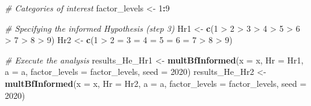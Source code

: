 \documentclass[
  english,
  man,floatsintext]{apa6}
\newenvironment{Shaded}{\begin{snugshade}}{\end{snugshade}}
\newcommand{\CommentTok}[1]{\textcolor[rgb]{0.56,0.35,0.01}{\textit{#1}}}
\newcommand{\DataTypeTok}[1]{\textcolor[rgb]{0.13,0.29,0.53}{#1}}
\newcommand{\DecValTok}[1]{\textcolor[rgb]{0.00,0.00,0.81}{#1}}
\newcommand{\KeywordTok}[1]{\textcolor[rgb]{0.13,0.29,0.53}{\textbf{#1}}}
\newcommand{\NormalTok}[1]{#1}
\newcommand{\OperatorTok}[1]{\textcolor[rgb]{0.81,0.36,0.00}{\textbf{#1}}}
\newcommand{\StringTok}[1]{\textcolor[rgb]{0.31,0.60,0.02}{#1}}
\begin{document}
\begin{Shaded}
\begin{Highlighting}[]
\CommentTok{\# Categories of interest}
\NormalTok{factor\_levels \textless{}{-}}\StringTok{ }\DecValTok{1}\OperatorTok{:}\DecValTok{9}

\CommentTok{\# Specifying the informed Hypothesis (step 3)}
\NormalTok{Hr1 \textless{}{-}}\StringTok{ }\KeywordTok{c}\NormalTok{(}\StringTok{\textquotesingle{}1 \textgreater{} 2 \textgreater{} 3 \textgreater{} 4 \textgreater{} 5 \textgreater{} 6 \textgreater{} 7 \textgreater{} 8 \textgreater{} 9\textquotesingle{}}\NormalTok{)}
\NormalTok{Hr2 \textless{}{-}}\StringTok{ }\KeywordTok{c}\NormalTok{(}\StringTok{\textquotesingle{}1 \textgreater{} 2 = 3 = 4 = 5 = 6 = 7 \textgreater{} 8 \textgreater{} 9\textquotesingle{}}\NormalTok{)}

\CommentTok{\# Execute the analysis}
\NormalTok{results\_He\_Hr1 \textless{}{-}}\StringTok{ }\KeywordTok{multBfInformed}\NormalTok{(}\DataTypeTok{x =}\NormalTok{ x, }
                                 \DataTypeTok{Hr =}\NormalTok{ Hr1, }
                                 \DataTypeTok{a =}\NormalTok{ a, }
                                 \DataTypeTok{factor\_levels =}\NormalTok{ factor\_levels, }
                                 \DataTypeTok{seed =} \DecValTok{2020}\NormalTok{)}
\NormalTok{results\_He\_Hr2 \textless{}{-}}\StringTok{ }\KeywordTok{multBfInformed}\NormalTok{(}\DataTypeTok{x =}\NormalTok{ x, }
                                 \DataTypeTok{Hr =}\NormalTok{ Hr2, }
                                 \DataTypeTok{a =}\NormalTok{ a, }
                                 \DataTypeTok{factor\_levels =}\NormalTok{ factor\_levels, }
                                 \DataTypeTok{seed =} \DecValTok{2020}\NormalTok{)}
\end{Highlighting}
\end{Shaded}

\begin{Shaded}
\end{Shaded}
\end{document}
